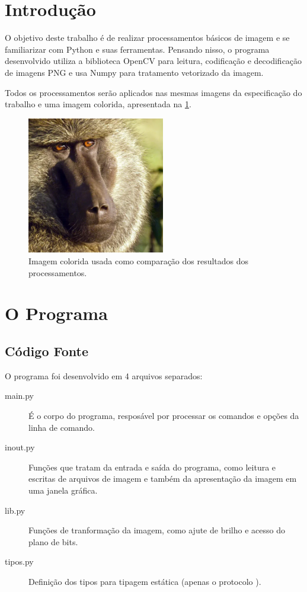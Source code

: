 \section{Introdução}

O objetivo deste trabalho é de realizar processamentos básicos de imagem e se familiarizar com Python e suas ferramentas. Pensando nisso, o programa desenvolvido utiliza a biblioteca OpenCV para leitura, codificação e decodificação de imagens PNG e usa Numpy para tratamento vetorizado da imagem.

Todos os processamentos serão aplicados nas mesmas imagens da especificação do trabalho e uma imagem colorida, apresentada na \cref{fig:color}.

\begin{figure}[H]
    \centering
    \includegraphics[width=6cm]{imagens/color.png}

    \caption{Imagem colorida usada como comparação dos resultados dos processamentos.}
    \label{fig:color}
\end{figure}

\section{O Programa}

\subsection{Código Fonte}

O programa foi desenvolvido em 4 arquivos separados:

\begin{description}
    \item[main.py] É o corpo do programa, resposável por processar os comandos e opções da linha de comando.

    \item[inout.py] Funções que tratam da entrada e saída do programa, como leitura e escritas de arquivos de imagem e também da apresentação da imagem em uma janela gráfica.

    \item[lib.py] Funções de tranformação da imagem, como ajute de brilho e acesso do plano de bits.

    \item[tipos.py] Definição dos tipos para tipagem estática (apenas o protocolo \autocite{ref:pep544} ).
\end{description}

